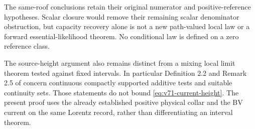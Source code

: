 The same-roof conclusions retain their original numerator and
positive-reference hypotheses. Scalar closure would remove their
remaining scalar denominator obstruction, but capacity recovery alone
is not a new path-valued local law or a forward essential-likelihood
theorem. No conditional law is defined on a zero reference class.

The source-height argument also remains distinct from a mixing local
limit theorem tested against fixed intervals. In particular Definition
2.2 and Remark 2.5 of \cite{DN} concern continuous compactly supported
additive tests and suitable continuity sets. Those statements do not
bound \eqref{eq:v71-current-height}. The present proof uses the
already established positive physical collar and the BV current on the
same Lorentz record, rather than differentiating an interval theorem.
\label{end:v71-new-mathematics}
